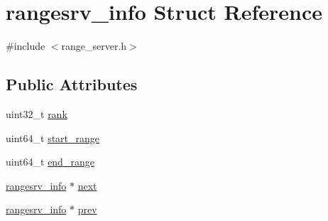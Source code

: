 \hypertarget{structrangesrv__info}{\section{rangesrv\-\_\-info Struct Reference}
\label{da/dce/structrangesrv__info}
}


{\ttfamily \#include $<$range\-\_\-server.\-h$>$}

\subsection*{Public Attributes}
\begin{DoxyCompactItemize}
\item 
uint32\-\_\-t \hyperlink{structrangesrv__info_af545372bc5a40a38b84408a208866960}{rank}
\item 
uint64\-\_\-t \hyperlink{structrangesrv__info_a5d3db4c7e640ad001ef9b4754ede40d4}{start\-\_\-range}
\item 
uint64\-\_\-t \hyperlink{structrangesrv__info_a680d57d20fcb44d199e4b313acd5db5f}{end\-\_\-range}
\item 
\hyperlink{structrangesrv__info}{rangesrv\-\_\-info} $\ast$ \hyperlink{structrangesrv__info_a7f87ab56d045e24e315b354075208b6d}{next}
\item 
\hyperlink{structrangesrv__info}{rangesrv\-\_\-info} $\ast$ \hyperlink{structrangesrv__info_af0a671859e5383bf4bab7f7a53b49b3b}{prev}
\end{DoxyCompactItemize}


